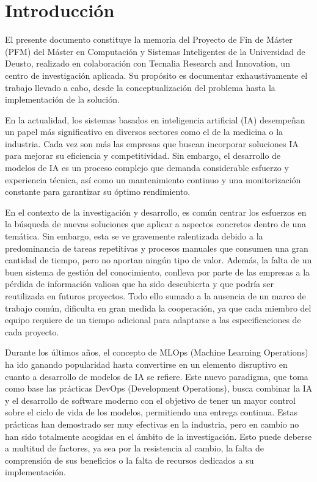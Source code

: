 \section{Introducción}
El presente documento constituye la memoria del Proyecto de Fin de Máster (PFM) del Máster 
en Computación y Sistemas Inteligentes de la Universidad de Deusto, realizado en colaboración con 
Tecnalia Research and Innovation, un centro de investigación aplicada. Su propósito es documentar 
exhaustivamente el trabajo llevado a cabo, desde la conceptualización del problema hasta la 
implementación de la solución.\medskip

En la actualidad, los sistemas basados en inteligencia artificial (IA) desempeñan un papel 
más significativo en diversos sectores como el de la medicina o la industria. Cada vez son más las 
empresas que buscan incorporar soluciones IA para mejorar su eficiencia y competitividad. Sin embargo, 
el desarrollo de modelos de IA es un proceso complejo que demanda considerable esfuerzo y experiencia técnica, 
así como un mantenimiento continuo y una monitorización constante para garantizar su óptimo rendimiento.\medskip

En el contexto de la investigación y desarrollo, es común centrar los esfuerzos en la búsqueda de nuevas
soluciones que aplicar a aspectos concretos dentro de una temática. Sin embargo, esta se ve gravemente 
ralentizada debido a la predominancia de tareas repetitivas y procesos manuales que consumen una gran
cantidad de tiempo, pero no aportan ningún tipo de valor. Además, la falta de un buen sistema de gestión
del conocimiento, conlleva por parte de las empresas a la pérdida de información valiosa que ha sido 
descubierta y que podría ser reutilizada en futuros proyectos. Todo ello sumado a la ausencia de un 
marco de trabajo común, dificulta en gran medida la cooperación, ya que cada miembro del equipo requiere 
de un tiempo adicional para adaptarse a las especificaciones de cada proyecto.\medskip

Durante los últimos años, el concepto de MLOps (Machine Learning Operations) ha ido ganando popularidad 
hasta convertirse en un elemento disruptivo en cuanto a desarrollo de modelos de IA se refiere. Este 
nuevo paradigma, que toma como base las prácticas DevOps (Development Operations), busca combinar la IA 
y el desarrollo de software moderno con el objetivo de tener un mayor control sobre el ciclo de 
vida de los modelos, permitiendo una entrega continua. Estas prácticas han demostrado 
ser muy efectivas en la industria, pero en cambio no han sido totalmente acogidas en el ámbito de la 
investigación. Esto puede deberse a multitud de factores, ya sea por la resistencia al cambio, 
la falta de comprensión de sus beneficios o la falta de recursos dedicados a su implementación.\medskip

